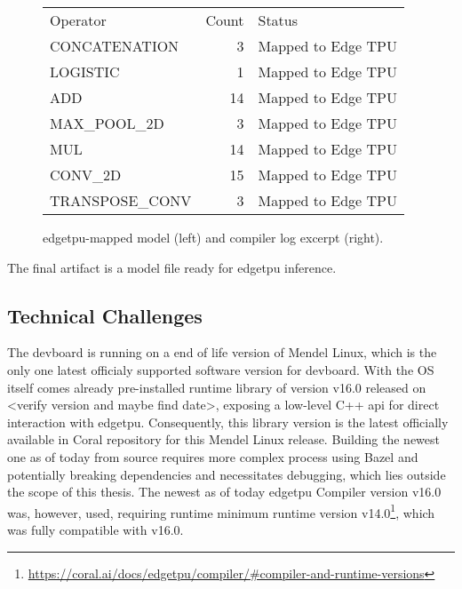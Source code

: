 {\begin{figure}[htbp]
\begin{minipage}[t]{0.74\textwidth}
    \vspace{0.5em}
    \begin{tabular}{@{}lrl@{}}
      Operator & Count & Status \\[0.5em]  %
      CONCATENATION & 3  & Mapped to Edge TPU \\
      LOGISTIC      & 1  & Mapped to Edge TPU \\
      ADD           & 14 & Mapped to Edge TPU \\
      MAX\_POOL\_2D & 3  & Mapped to Edge TPU \\
      MUL           & 14 & Mapped to Edge TPU \\
      CONV\_2D      & 15 & Mapped to Edge TPU \\
      TRANSPOSE\_CONV & 3 & Mapped to Edge TPU
    \end{tabular}
    \vspace*{\fill}        %
\end{minipage}
\caption{\gls{edgetpu}-mapped model (left) and compiler log excerpt (right).}
\label{fig:successcompile}
\end{figure}

The final artifact is a  model file ready for \gls{edgetpu} inference.

\subsection*{Technical Challenges}

The \gls{devboard} is running on a end of life version of Mendel Linux, which is the only one latest officialy supported software version for \gls{devboard}.
With the OS itself comes already pre-installed runtime library  of version v16.0 released on <verify version and maybe find date>, exposing a low-level C++ \gls{api}
for direct interaction with \gls{edgetpu}. Consequently, this library version is the latest officially available in Coral repository for this Mendel Linux release.
Building the newest one as of today from source requires more complex process using Bazel and potentially breaking dependencies and necessitates debugging,
which lies outside the scope of this thesis.
The newest as of today \gls{edgetpu} Compiler version v16.0 was, however, used,
requiring runtime minimum runtime version v14.0\footnote{\url{https://coral.ai/docs/edgetpu/compiler/\#compiler-and-runtime-versions}},
which was fully compatible with  v16.0.

}
